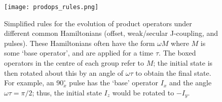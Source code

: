 \begin{figure}[ht]
    \centering
    \texttt{[image: prodops\_rules.png]}
    \caption[Simplified rules for product operator evolutions]{
        Simplified rules for the evolution of product operators under different common Hamiltonians (offset, weak/secular J-coupling, and pulses).
        These Hamiltonians often have the form $\omega M$ where $M$ is some `base operator', and are applied for a time $\tau$.
        The boxed operators in the centre of each group refer to $M$; the initial state is then rotated about this by an angle of $\omega\tau$ to obtain the final state.
        For example, an $90^\circ_x$ pulse has the `base' operator $I_x$ and the angle $\omega\tau = \pi/2$; thus, the initial state $I_z$ would be rotated to $-I_y$.
    }
    \label{fig:prodops_rules}
\end{figure}

